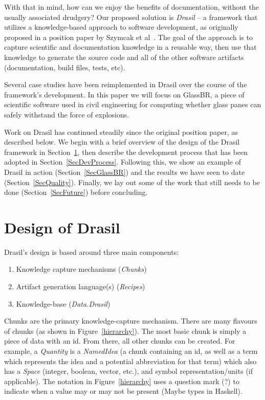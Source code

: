 \documentclass[sigconf]{acmart}
\begin{document}
With that in mind, how can we enjoy the benefits of documentation, without the usually
associated drudgery? Our proposed solution is \textit{Drasil} -- a framework that utilizes
a knowledge-based approach to software development, as originally proposed in a
position paper by Szymcak et al~\cite{SzymczakEtAl2016}. The goal of the
approach is to capture scientific and documentation knowledge in a reusable way,
then use that knowledge to generate the source code and all of the other software
artifacts (documentation, build files, tests, etc).

Several case studies have been reimplemented in Drasil over the course of the framework's development. In this paper we will focus on GlassBR, a piece of scientific software used in civil engineering for computing whether glass panes can safely withstand the force of explosions.

Work on Drasil has continued steadily since the original position paper, as
described below. We begin with a brief overview of the design of the Drasil
framework in Section~\ref{SecDesign}, then describe the development process that
has been adopted in Section~\ref{SecDevProcess}. Following this, we show an example of
Drasil in action (Section~\ref{SecGlassBR}) and the results we have seen to date
(Section~\ref{SecQuality}). Finally, we lay out some of the work that still
needs to be done (Section~\ref{SecFuture}) before concluding.

\section{Design of Drasil} \label{SecDesign}

Drasil's design is based around three main components:
\begin{enumerate}
	\item Knowledge capture mechanisms (\textit{Chunks})
	\item Artifact generation language(s) (\textit{Recipes})
	\item Knowledge-base (\textit{Data.Drasil})
\end{enumerate}

Chunks are the primary knowledge-capture mechanism. There are many flavours of 
chunks (as shown in Figure~\ref{hierarchy}). The most basic chunk is simply a 
piece of data with an id. From there, all other chunks can be created. For 
example, a \textit{Quantity} is a \textit{NamedIdea} (a chunk containing an id, 
as well as a term which represents the idea and a potential abbreviation for 
that term) which also has a \textit{Space} (integer, boolean, vector, etc.), 
and symbol representation/units (if applicable).  The notation in
Figure~\ref{hierarchy} uses a question mark (?) to indicate when a value may or
may not be present (Maybe types in Haskell).
\end{document}
